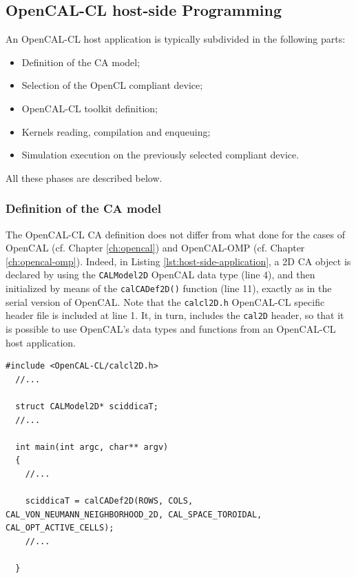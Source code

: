 \subsection{OpenCAL-CL host-side Programming}

An OpenCAL-CL host application is typically
subdivided in the following parts:
\begin{itemize}
\item Definition of the CA model;
\item Selection of the OpenCL compliant device;
\item OpenCAL-CL toolkit definition;
\item Kernels reading, compilation and enqueuing;
\item Simulation execution on the previously selected compliant
  device.
\end{itemize}

All these phases are described below.

\subsubsection{Definition of the CA model}

The OpenCAL-CL CA definition does not differ from what done for the
cases of OpenCAL (cf. Chapter \ref{ch:opencal}) and OpenCAL-OMP
(cf. Chapter \ref{ch:opencal-omp}). Indeed, in Listing
\ref{lst:host-side-application}, a 2D CA object is declared by using
the \verb'CALModel2D' OpenCAL data type (line 4), and then initialized
by means of the \verb'calCADef2D()' function (line 11), exactly as in
the serial version of OpenCAL. Note that the \verb'calcl2D.h'
OpenCAL-CL specific header file is included at line 1. It, in turn,
includes the \verb'cal2D' header, so that it is possible to use
OpenCAL's data types and functions from an OpenCAL-CL host
application.

\begin{lstlisting}[float,floatplacement=H, label=lst:host-side-application, caption={An example of OpenCAL-CL host-side application.}] 
  #include <OpenCAL-CL/calcl2D.h>
  //...

  struct CALModel2D* sciddicaT;
  //...
  
  int main(int argc, char** argv)
  {
    //...

    sciddicaT = calCADef2D(ROWS, COLS, CAL_VON_NEUMANN_NEIGHBORHOOD_2D, CAL_SPACE_TOROIDAL, CAL_OPT_ACTIVE_CELLS);
    //...
        
  }
\end{lstlisting}


